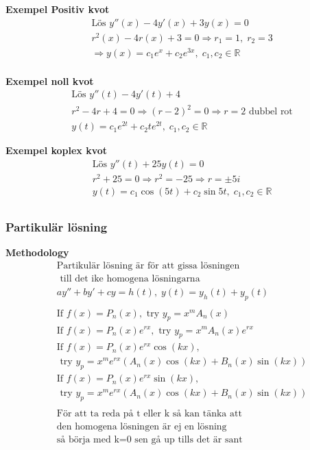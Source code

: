 \begin{multicols}{2}
\textbf{Exempel Positiv kvot}
\begin{align*}
  &\text{Lös } y''(x)-4y'(x)+3y(x)=0 \\
  &r^2(x)-4r(x)+3=0 \Rightarrow r_1=1, \; r_2=3 \\
  &\Rightarrow y(x) = c_1e^x + c_2e^{3x}, \; c_1,c_2 \in\mathbb{R} \\
\end{align*}

\textbf{Exempel noll kvot}
\begin{align*}
  &\text{Lös } y''(t)-4y'(t)+4 \\
  &r^2-4r+4=0 \Rightarrow {(r-2)}^2=0 \Rightarrow r=2 \text{ dubbel rot} \\
  &y(t) = c_1e^{2t} + c_2te^{2t}, \; c_1,c_2 \in\mathbb{R}
\end{align*}

\textbf{Exempel koplex kvot}
\begin{align*}
  &\text{Lös } y''(t) + 25y(t) = 0 \\
  &r^2 + 25 = 0 \Rightarrow r^2 = -25 \Rightarrow r=\pm5i \\
  &y(t) = c_1\cos(5t)+c_2\sin{5t}, \; c_1,c_2 \in\mathbb{R} \\
\end{align*}


\subsubsection{Partikulär lösning}
\textbf{Methodology}  %
\begin{align*}
  &\text{Partikulär lösning är för att gissa lösningen} \\
  &\text{ till det ike homogena lösningarna} \\
  &ay''+by'+cy=h(t), \; y(t) = y_h(t) + y_p(t) \\
  &\\
  &\text{If } f(x)=P_n(x), \text{ try } y_p=x^m A_n(x) \\
  &\text{If } f(x)=P_n(x)e^{rx}, \text{ try } y_p=x^m A_n(x)e^{rx} \\
  &\text{If } f(x)=P_n(x)e^{rx}\cos(kx), \\
  &\text{ try } y_p=x^m e^{rx}(A_n(x)\cos(kx)+B_n(x)\sin(kx)) \\
  &\text{If } f(x)=P_n(x)e^{rx}\sin(kx), \\ 
  &\text{ try } y_p=x^m e^{rx}(A_n(x)\cos(kx)+B_n(x)\sin(kx)) \\ 
  &\\
  &\text{För att ta reda på t eller k så kan tänka att} \\
  &\text{den homogena lösningen är ej en lösning } \\
  &\text{så börja med k=0 sen gå up tills det är sant} \\
\end{align*}



\end{multicols}
